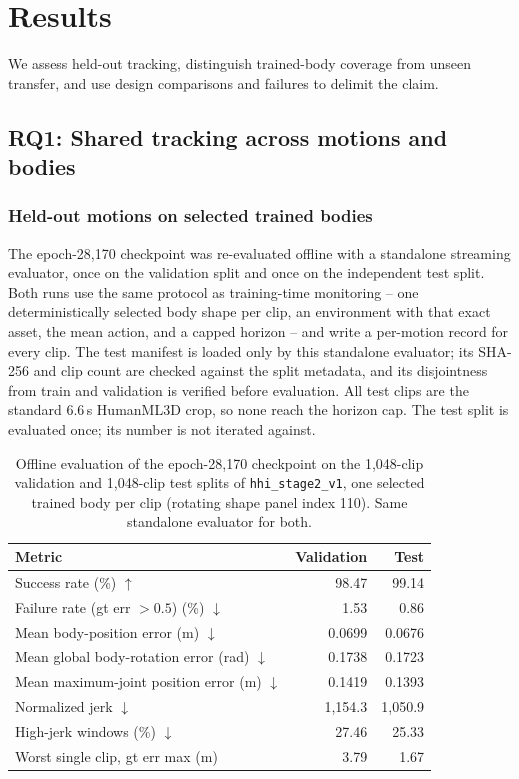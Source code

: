 \documentclass[11pt]{article}
\begin{document}
\section{Results}\label{sec:results}
We assess held-out tracking, distinguish trained-body coverage from unseen
transfer, and use design comparisons and failures to delimit the claim.

\subsection{RQ1: Shared tracking across motions and bodies}\subsubsection{Held-out motions on selected trained bodies}\label{sec:test_results}

The epoch-28,170 checkpoint was re-evaluated offline with a standalone
streaming evaluator, once on the validation split and once on the
independent test split. Both runs use the same protocol as training-time
monitoring -- one deterministically selected body shape per clip, an
environment with that exact asset, the mean action, and a capped horizon --
and write a per-motion record for every clip. The test manifest is loaded
only by this standalone evaluator; its SHA-256 and clip count are checked
against the split metadata, and its disjointness from train and validation is
verified before evaluation. All test clips are the standard 6.6\,s HumanML3D
crop, so none reach the horizon cap. The test split is evaluated once; its
number is not iterated against.

\begin{table}[t]
\centering
\small
\caption{Offline evaluation of the epoch-28,170 checkpoint on the 1,048-clip
validation and 1,048-clip test splits of \texttt{hhi\_stage2\_v1}, one
selected trained body per clip (rotating shape panel index 110). Same
standalone evaluator for both.}\label{tab:test_results}
\begin{tabular}{lrr}
\toprule
Metric & Validation & Test \\
\midrule
Success rate (\%) $\uparrow$ & 98.47 & 99.14 \\
Failure rate (gt err $>0.5$) (\%) $\downarrow$ & 1.53 & 0.86 \\
Mean body-position error (m) $\downarrow$ & 0.0699 & 0.0676 \\
Mean global body-rotation error (rad) $\downarrow$ & 0.1738 & 0.1723 \\
Mean maximum-joint position error (m) $\downarrow$ & 0.1419 & 0.1393 \\
Normalized jerk $\downarrow$ & 1,154.3 & 1,050.9 \\
High-jerk windows (\%) $\downarrow$ & 27.46 & 25.33 \\
Worst single clip, gt err max (m) & 3.79 & 1.67 \\
\bottomrule
\end{tabular}
\end{table}
\end{document}
